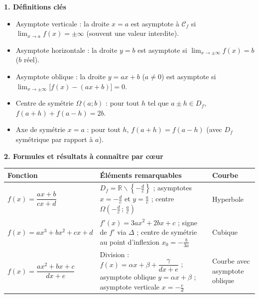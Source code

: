 \documentclass[11pt]{article}
\newcommand{\cle}[1]{{\popxbold\color{popdark}#1}}
\def\setminus{\mathbin{\backslash}}\let\smallsetminus\setminus
\begin{document}
\begin{bilan}
\textbf{1. Définitions clés}
\begin{itemize}
\item \cle{Asymptote verticale} : la droite $x=a$ est asymptote à $\mathcal{C}_f$ si $\displaystyle\lim_{x\to a}f(x)=\pm\infty$ (souvent une valeur interdite).
\item \cle{Asymptote horizontale} : la droite $y=b$ est asymptote si $\displaystyle\lim_{x\to\pm\infty}f(x)=b$ ($b$ réel).
\item \cle{Asymptote oblique} : la droite $y=ax+b$ ($a\neq 0$) est asymptote si $\displaystyle\lim_{x\to\pm\infty}\big[f(x)-(ax+b)\big]=0$.
\item \cle{Centre de symétrie} $\Omega(a;b)$ : pour tout $h$ tel que $a\pm h\in D_f$, $f(a+h)+f(a-h)=2b$.
\item \cle{Axe de symétrie} $x=a$ : pour tout $h$, $f(a+h)=f(a-h)$ (avec $D_f$ symétrique par rapport à $a$).
\end{itemize}

\textbf{2. Formules et résultats à connaître par cœur}
\begin{center}
\begin{tabularx}{\linewidth}{|l|X|X|}\hline
\rowcolor{popblueL} \textbf{Fonction} & \textbf{Éléments remarquables} & \textbf{Courbe} \\ \hline
$f(x)=\dfrac{ax+b}{cx+d}$ & $D_f=\mathbb{R}\setminus\left\{-\frac{d}{c}\right\}$ ; asymptotes $x=-\frac{d}{c}$ et $y=\frac{a}{c}$ ; centre $\Omega\left(-\frac{d}{c}\,;\,\frac{a}{c}\right)$ & Hyperbole \\ \hline
$f(x)=ax^3+bx^2+cx+d$ & $f'(x)=3ax^2+2bx+c$ ; signe de $f'$ via $\Delta$ ; centre de symétrie au point d'inflexion $x_0=-\frac{b}{3a}$ & Cubique \\ \hline
$f(x)=\dfrac{ax^2+bx+c}{dx+e}$ & Division : $f(x)=\alpha x+\beta+\dfrac{\gamma}{dx+e}$ ; asymptote oblique $y=\alpha x+\beta$ ; asymptote verticale $x=-\frac{e}{d}$ & Courbe avec asymptote oblique \\ \hline
\end{tabularx}
\end{center}


\end{bilan}
\end{document}
